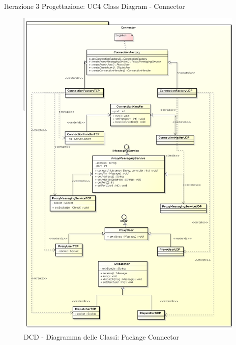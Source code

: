 \documentclass[t]{beamer} %
\begin{document}
\begin{frame} {Iterazione 3 Progettazione: UC4 Class Diagram - Connector}
   \begin{figure}
     \includegraphics[scale=0.125]{image_astah/Iteration_3_DesignModel/ClassDiagramConnector.png}{\centering}
     \caption{DCD - Diagramma delle Classi: Package Connector }
     \label{fig_UC4_DCD_4} 
   \end{figure}
\end{frame}
\end{document}
